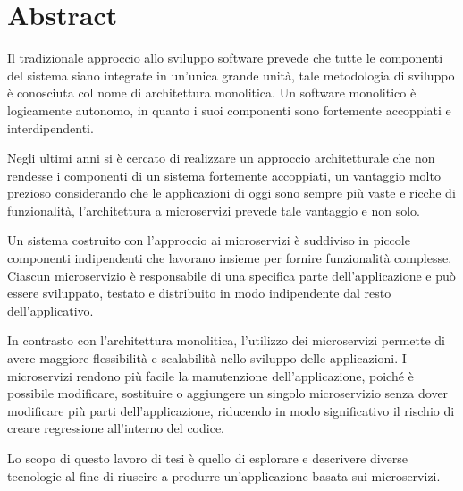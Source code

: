 \chapter*{Abstract}
Il tradizionale approccio allo sviluppo software prevede che tutte le componenti del sistema siano
integrate in un’unica grande unità, tale metodologia di sviluppo è conosciuta col nome di architettura
monolitica. Un software monolitico è logicamente autonomo, in quanto i suoi componenti sono fortemente
accoppiati e interdipendenti.

Negli ultimi anni si è cercato di realizzare un approccio architetturale che non rendesse i componenti di
un sistema fortemente accoppiati, un vantaggio molto prezioso considerando che le applicazioni di oggi
sono sempre più vaste e ricche di funzionalità, l'architettura a microservizi prevede tale vantaggio e non solo.

Un sistema costruito con l'approccio ai microservizi è suddiviso in piccole componenti indipendenti che lavorano insieme per fornire funzionalità complesse. Ciascun microservizio è
responsabile di una specifica parte dell'applicazione e può essere sviluppato, testato e distribuito in
modo indipendente dal resto dell'applicativo.

In contrasto con l'architettura monolitica, l'utilizzo dei microservizi permette di avere maggiore
flessibilità e scalabilità nello sviluppo delle applicazioni. I microservizi rendono più facile
la manutenzione dell'applicazione, poiché è possibile modificare, sostituire o aggiungere un singolo microservizio
senza dover modificare più parti dell'applicazione, riducendo in modo significativo il rischio di creare regressione
all'interno del codice.

Lo scopo di questo lavoro di tesi è quello di esplorare e descrivere diverse tecnologie al fine di riuscire a produrre un'applicazione basata sui microservizi.